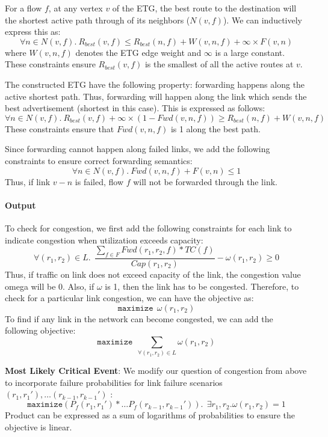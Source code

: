 \documentclass[]{article}
\begin{document}
For a flow $f$, at any vertex $v$ of the ETG, the best route to the
destination will the shortest active path through of its neighbors ($N(v,f)$).
We can inductively express this as: 
\begin{equation}
	\forall n \in N(v,f).~ R_{best}(v, f) \leq R_{best} (n, f) + W(v, n, f) + \infty \times F(v,n) 
\end{equation}
where $W(v,n,f)$ denotes the ETG edge weight and $\infty$ is a large constant. These
constraints ensure $R_{best}(v, f)$ is the smallest of all the active routes at $v$.

The constructed ETG have the following property: forwarding happens along the
active shortest path. Thus, forwarding will happen along the link which sends
the best advertisement (shortest in this case). This is expressed as follows:
\begin{equation}
	\forall n \in N(v,f). ~R_{best}(v,f) + \infty \times (1 - Fwd(v,n,f)) \geq R_{best} (n, f) + W(v, n, f)
\end{equation}
These constraints ensure that $Fwd(v,n,f)$ is 1 along the best path.

Since forwarding cannot happen along failed links, we add the following 
constraints to ensure correct forwarding semantics:
\begin{equation}
\forall n \in N(v,f).~Fwd(v,n,f) + F(v,n) \leq 1 
\end{equation}
Thus, if link $v-n$ is failed, flow $f$ will not be forwarded through the link.

\noindent\paragraph{Output} 
To check for congestion, we first add the following constraints for 
each link to indicate congestion when utilization exceeds capacity: 
\begin{equation}
\forall (r_1, r_2) \in L. ~~\frac{\sum_{f \in F} Fwd(r_1, r_2, f) * TC(f)}{Cap(r_1, r_2)} - \omega(r_1, r_2) \geq 0
\end{equation}
Thus, if traffic on link does not exceed capacity of the link, the congestion value
omega will be 0. Also, if $\omega$ is 1, then the link has to be congested. Therefore,
to check for a particular link congestion, we can have the objective as:
\[
\texttt{maximize} ~~\omega(r_1, r_2)
\]	
To find if any link in the network can become congested, we can add the following
objective:
\[
\texttt{maximize} ~~\sum_{\forall (r_1,r_2) \in L} \omega(r_1, r_2)
\]


\textbf{Most Likely Critical Event}: We modify our question of congestion from above to
incorporate failure probabilities for link failure scenarios $(r_1, r_1'),\ldots(r_{k-1}, r_{k-1}')$ : 
\[
\texttt{maximize} (P_f(r_1,r_1') *\ldots P_f(r_{k-1}, r_{k-1}')). 
~~\exists r_1, r_2. \omega(r_1, r_2) = 1
\]
Product can be expressed as a sum of logarithms of probabilities to ensure the objective is linear. 

%

 
\begin{small}
	
\end{small}
\end{document}
